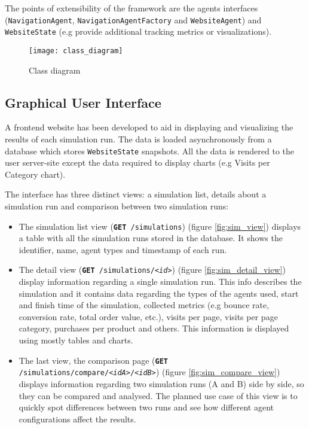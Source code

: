 The points of extensibility of the framework are the agents interfaces 
(\texttt{NavigationAgent}, \texttt{NavigationAgentFactory} and 
\texttt{WebsiteAgent}) and \texttt{WebsiteState} (e.g provide additional 
tracking metrics or visualizations).

\begin{figure}[p]
    \begin{center}
        \leavevmode
        \texttt{[image: class\_diagram]}
        \caption{Class diagram}
        \label{fig:class}
    \end{center}
\end{figure}

\subsection{Graphical User Interface}

A frontend website has been developed to aid in displaying and visualizing the 
results of each simulation run. The data is loaded asynchronously from a 
database which stores \texttt{WebsiteState} snapshots. All the data is rendered 
to the user server-site except the data required to display charts (e.g Visits 
per Category chart).

The interface has three distinct views: a simulation list, details about a 
simulation run and comparison between two simulation runs:

\begin{itemize}
    \item The simulation list view (\texttt{\textbf{GET} /simulations}) (figure 
    \ref{fig:sim_view}) displays a table 
    with all the simulation runs stored in the database. It shows the 
    identifier, name, agent types and timestamp of each run.
    \item The detail view (\texttt{\textbf{GET} /simulations/\textit{<id>}}) 
    (figure \ref{fig:sim_detail_view})
    display information regarding a single simulation run. This info describes 
    the simulation and it contains data regarding the types of the agents used, 
    start and finish time of the simulation, collected metrics (e.g bounce 
    rate, conversion rate, total order value, etc.), visits per page, visits 
    per page category, purchases per product and others. This information is 
    displayed using mostly tables and charts.
    \item The last view, the comparison page (\texttt{\textbf{GET} 
    /simulations/compare/\textit{<idA>}/\textit{<idB>}}) (figure 
    \ref{fig:sim_compare_view}) displays information 
    regarding two simulation runs (A and B) side by side, so they can be 
    compared and analysed. The planned use case of this view is to quickly spot 
    differences between two runs and see how different agent configurations 
    affect the results.
\end{itemize}


